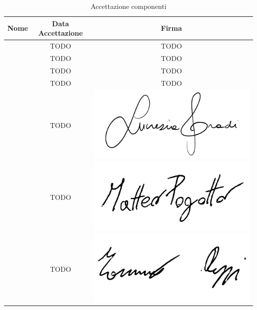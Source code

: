 \renewcommand{\arraystretch}{1}
	\begin{table}[H]
		\begin{center}
			\setlength{\aboverulesep}{0pt}
			\setlength{\belowrulesep}{0pt}
			\setlength{\extrarowheight}{.75ex}
			\begin{tabular}{ c c c}
				\rowcolor{AzzurroGruppo!30} 
				\textbf{Nome} & \textbf{Data Accettazione} & \textbf{Firma} \\
				\toprule
				
				\Davide{} & TODO & TODO \\
				\Giosue{} & TODO & TODO \\
				\Francesco{} & TODO & TODO \\
				\Daniele{} & TODO & TODO \\
				\Lucrezia{} & TODO & \includegraphics[scale = 0.5]{components/img/firme_membri/firma-lg.png} \\
				\Matteo{} & TODO & \includegraphics[scale = 0.12]{components/img/firme_membri/firma-mp.png} \\
				\Tommaso{} & TODO & \includegraphics[scale = 0.5]{components/img/firme_membri/firma-tp.png} \\
				
				\bottomrule
			\end{tabular}
			\caption{Accettazione componenti}
		\end{center}
    \end{table}


